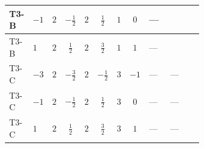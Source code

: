 \documentclass[8pt]{article}
\begin{document}
\begin{landscape}
\begin{longtable}{@{}llcccccc >{\raggedright\arraybackslash}p{0.21\linewidth} >{\raggedright\arraybackslash}p{0.21\linewidth} >{\raggedright\arraybackslash}p{0.21\linewidth}@{}}
\midrule
T3-B & $-1$ & $2$ & $-\frac{1}{2}$ & $2$ & $\frac{1}{2}$ & $1$ & $0$ & --- & \scriptsize\adjustbox{max width=\linewidth}{$\begin{gathered} {\lambda_{HS_2}^{(A)}} (2 T_{\nu}^{(2)}+6 \operatorname{Tr}\!\left({Y_d}\,\left({Y_d}\right)^{\dagger}\right)+2 \operatorname{Tr}\!\left({Y_e}\,\left({Y_e}\right)^{\dagger}\right)+6 \operatorname{Tr}\!\left({Y_u}\,\left({Y_u}\right)^{\dagger}\right))\end{gathered}$} & \scriptsize\adjustbox{max width=\linewidth}{$\begin{gathered} +8 \operatorname{Tr}\!\left({y_2}\,\left({y_2}\right)^{\dagger}\,{Y_e}\,\left({Y_e}\right)^{\dagger}\right)\end{gathered}$} \\
\midrule
T3-B & $1$ & $2$ & $\frac{1}{2}$ & $2$ & $\frac{3}{2}$ & $1$ & $1$ & --- & \scriptsize\adjustbox{max width=\linewidth}{$\begin{gathered} {\lambda_{HS_2}^{(A)}} (2 T_{\nu}^{(2)}+6 \operatorname{Tr}\!\left({Y_d}\,\left({Y_d}\right)^{\dagger}\right)+2 \operatorname{Tr}\!\left({Y_e}\,\left({Y_e}\right)^{\dagger}\right)+6 \operatorname{Tr}\!\left({Y_u}\,\left({Y_u}\right)^{\dagger}\right))\end{gathered}$} & \scriptsize\adjustbox{max width=\linewidth}{$\begin{gathered} +8 \operatorname{Tr}\!\left({y_2}\,\left({y_2}\right)^{\dagger}\,{Y_e}\,\left({Y_e}\right)^{\dagger}\right)\end{gathered}$} \\
\midrule
T3-C & $-3$ & $2$ & $-\frac{3}{2}$ & $2$ & $-\frac{1}{2}$ & $3$ & $-1$ & --- & --- & \scriptsize\adjustbox{max width=\linewidth}{$\begin{gathered} -4 \operatorname{Tr}\!\left({y_2}\,\left({y_2}\right)^{\dagger}\,{Y_e}\,\left({Y_e}\right)^{\dagger}\right)\end{gathered}$} \\
\midrule
T3-C & $-1$ & $2$ & $-\frac{1}{2}$ & $2$ & $\frac{1}{2}$ & $3$ & $0$ & --- & --- & \scriptsize\adjustbox{max width=\linewidth}{$\begin{gathered} -4 \operatorname{Tr}\!\left({y_2}\,\left({y_2}\right)^{\dagger}\,{Y_e}\,\left({Y_e}\right)^{\dagger}\right)\end{gathered}$} \\
\midrule
T3-C & $1$ & $2$ & $\frac{1}{2}$ & $2$ & $\frac{3}{2}$ & $3$ & $1$ & --- & --- & \scriptsize\adjustbox{max width=\linewidth}{$\begin{gathered} -4 \operatorname{Tr}\!\left({y_2}\,\left({y_2}\right)^{\dagger}\,{Y_e}\,\left({Y_e}\right)^{\dagger}\right)\end{gathered}$} \\

\end{longtable}
\end{landscape}
\end{document}
